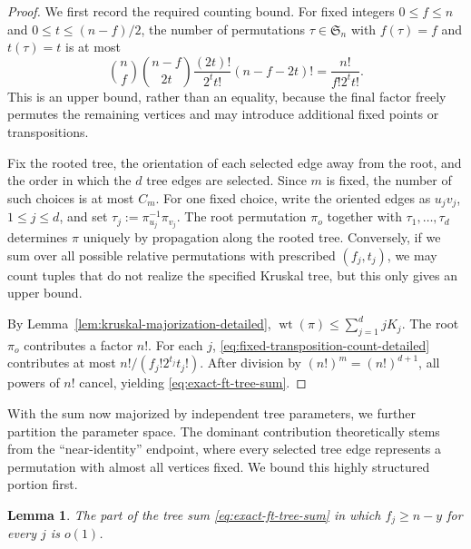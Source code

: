 \documentclass[10pt,a4paper]{amsart}
\newtheorem{lemma}[theorem]{Lemma}
\renewcommand\le{\leqslant}
\renewcommand\ge{\geqslant}
\newcommand{\wt}{\operatorname{wt}}
\begin{document}
\begin{proof}
We first record the required counting bound. For fixed integers $0\le f\le n$ and $0\le t\le (n-f)/2$, the number of permutations $\tau\in\mathfrak S_n$ with $f(\tau)=f$ and $t(\tau)=t$ is at most
\begin{equation}\label{eq:fixed-transposition-count-detailed}
        \binom nf\binom{n-f}{2t}\frac{(2t)!}{2^t t!}(n-f-2t)!
        =\frac{n!}{f!2^t t!}.
\end{equation}
This is an upper bound, rather than an equality, because the final factor freely permutes the remaining vertices and may introduce additional fixed points or transpositions.

Fix the rooted tree, the orientation of each selected edge away from the root, and the order in which the $d$ tree edges are selected. Since $m$ is fixed, the number of such choices is at most $C_m$. For one fixed choice, write the oriented edges as $u_jv_j$, $1\le j\le d$, and set $\tau_j:=\pi_{u_j}^{-1}\pi_{v_j}$. The root permutation $\pi_o$ together with $\tau_1,\ldots,\tau_d$ determines $\pi$ uniquely by propagation along the rooted tree. Conversely, if we sum over all possible relative permutations with prescribed $(f_j,t_j)$, we may count tuples that do not realize the specified Kruskal tree, but this only gives an upper bound.

By Lemma~\ref{lem:kruskal-majorization-detailed},
$\wt(\pi)\le \sum_{j=1}^d jK_j$. The root $\pi_o$ contributes a factor $n!$. For each $j$, \eqref{eq:fixed-transposition-count-detailed} contributes at most $n!/(f_j!2^{t_j}t_j!)$. After division by $(n!)^m=(n!)^{d+1}$, all powers of $n!$ cancel, yielding \eqref{eq:exact-ft-tree-sum}.
\end{proof}

With the sum now majorized by independent tree parameters, we further partition the parameter space. The dominant contribution theoretically stems from the ``near-identity'' endpoint, where every selected tree edge represents a permutation with almost all vertices fixed. We bound this highly structured portion first.

\begin{lemma}\label{lem:near-endpoint-contribution-detailed}
The part of the tree sum \eqref{eq:exact-ft-tree-sum} in which $f_j\ge n-y$ for every $j$ is $o(1)$.
\end{lemma}
\end{document}
